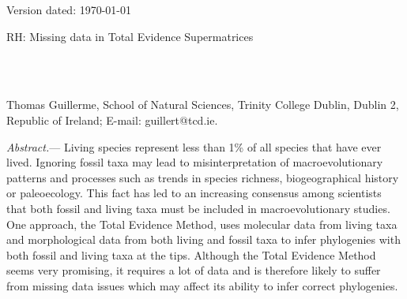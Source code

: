 \documentclass[12pt,letterpaper]{article}
\renewcommand{\subsubsection}[1]{%
\vspace{2ex}
\noindent
\textit{#1.}---}
\begin{document}
\begin{flushright}
Version dated: \today
\end{flushright}
\bigskip
\noindent RH: Missing data in Total Evidence Supermatrices %

\bigskip
\medskip
\begin{center}

\bigskip


\\
\\
\end{center}
\medskip
{} Thomas Guillerme, School of Natural Sciences, Trinity College Dublin, Dublin 2, Republic of Ireland; E-mail: guillert@tcd.ie.\\
\vspace{1in}


\subsubsection{Abstract}
Living species represent less than 1\% of all species that have ever lived. Ignoring fossil taxa may lead to misinterpretation of macroevolutionary patterns and processes such as trends in species richness, biogeographical history or paleoecology. This fact has led to an increasing consensus among scientists that both fossil and living taxa must be included in macroevolutionary studies. One approach, the Total Evidence Method, uses molecular data from living taxa and morphological data from both living and fossil taxa to infer phylogenies with both fossil and living taxa at the tips. Although the Total Evidence Method seems very promising, it requires a lot of data and is therefore likely to suffer from missing data issues which may affect its ability to infer correct phylogenies.
\end{document}
